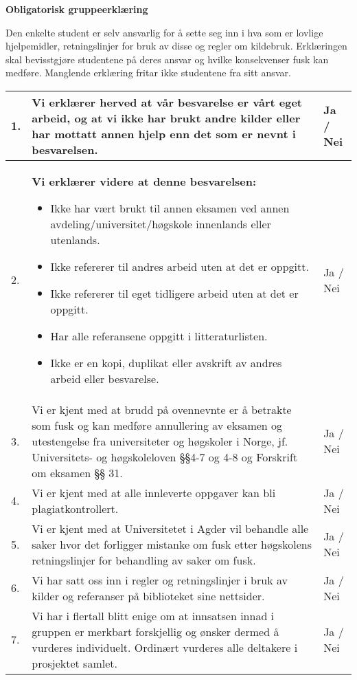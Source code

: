 

\large{\bf{Obligatorisk gruppeerklæring}} \\

{\small {}
Den enkelte student er selv ansvarlig for å sette seg inn i hva som er lovlige hjelpemidler, retningslinjer for bruk av disse og regler om kildebruk. Erklæringen skal bevisstgjøre studentene på deres ansvar og hvilke konsekvenser fusk kan medføre. Manglende erklæring fritar ikke studentene fra sitt ansvar.\\

\begin{center}
\begin{tabular}{ |p{1cm}|p{11.5cm}|p{1cm}|}
 \hline  
 
 1. & Vi erklærer herved at vår besvarelse er vårt eget arbeid, og at vi ikke har brukt andre kilder eller har mottatt annen hjelp enn det som er nevnt i besvarelsen. & Ja / Nei \\
 \hline
 2. & \textbf{Vi erklærer videre at denne besvarelsen:}
 \begin{itemize}
    \item Ikke har vært brukt til annen eksamen ved annen avdeling/universitet/høgskole innenlands eller utenlands.
    \item Ikke refererer til andres arbeid uten at det er oppgitt.
    \item Ikke refererer til eget tidligere arbeid uten at det er oppgitt.
    \item Har alle referansene oppgitt i litteraturlisten.
    \item Ikke er en kopi, duplikat eller avskrift av andres arbeid eller besvarelse.
 \end{itemize}& Ja / Nei \\
 \hline
 3. & Vi er kjent med at brudd på ovennevnte er å betrakte som fusk og kan medføre annullering av eksamen og utestengelse fra universiteter og høgskoler i Norge, jf. Universitets- og høgskoleloven §§4-7 og 4-8 og Forskrift om eksamen §§ 31.
 & Ja / Nei \\
 \hline
 4. & Vi er kjent med at alle innleverte oppgaver kan bli plagiatkontrollert.
 & Ja / Nei \\
 \hline
 5. & Vi er kjent med at Universitetet i Agder vil behandle alle saker hvor det forligger mistanke om fusk etter høgskolens retningslinjer for behandling av saker om fusk.
 & Ja / Nei \\
 \hline
 6. & Vi har satt oss inn i regler og retningslinjer i bruk av kilder og referanser på biblioteket sine nettsider.
 & Ja / Nei \\
 \hline
 7. & Vi har i flertall blitt enige om at innsatsen innad i gruppen er merkbart forskjellig og ønsker dermed å vurderes individuelt.
Ordinært vurderes alle deltakere i prosjektet samlet.
 & Ja / Nei \\
 \hline
\end{tabular}
\end{center}}

